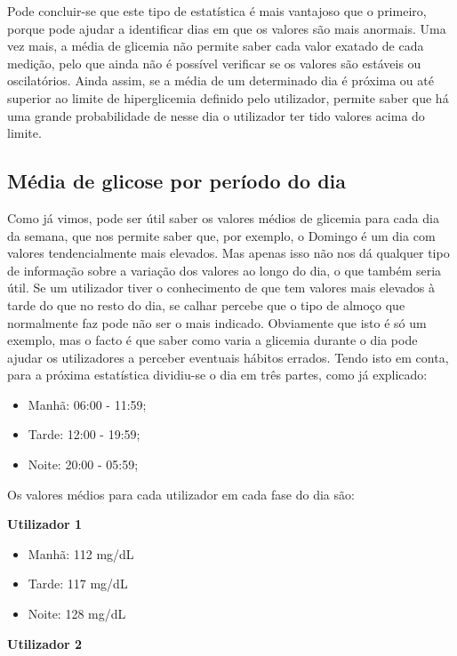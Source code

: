 Pode concluir-se que este tipo de estatística é mais vantajoso que o primeiro, porque pode ajudar a identificar dias em que os valores são mais anormais. Uma vez mais, a média de glicemia não permite saber cada valor exatado de cada medição, pelo que ainda não é possível verificar se os valores são estáveis ou oscilatórios. Ainda assim, se a média de um determinado dia é próxima ou até superior ao limite de hiperglicemia definido pelo utilizador, permite saber que há uma grande probabilidade de nesse dia o utilizador ter tido valores acima do limite.

\subsection{Média de glicose por período do dia}

Como já vimos, pode ser útil saber os valores médios de glicemia para cada dia da semana, que nos permite saber que, por exemplo, o Domingo é um dia com valores tendencialmente mais elevados. Mas apenas isso não nos dá qualquer tipo de informação sobre a variação dos valores ao longo do dia, o que também seria útil. Se um utilizador tiver o conhecimento de que tem valores mais elevados à tarde do que no resto do dia, se calhar percebe que o tipo de almoço que normalmente faz pode não ser o mais indicado. Obviamente que isto é só um exemplo, mas o facto é que saber como varia a glicemia durante o dia pode ajudar os utilizadores a perceber eventuais hábitos errados. 
Tendo isto em conta, para a próxima estatística dividiu-se o dia em três partes, como já explicado:

\begin{itemize}
\item Manhã: 06:00 - 11:59;
\item Tarde: 12:00 - 19:59;
\item Noite: 20:00 - 05:59;
\end{itemize}

Os valores médios para cada utilizador em cada fase do dia são:\newline

\textbf{Utilizador 1}

\begin{itemize}
\item Manhã: 112 mg/dL
\item Tarde: 117 mg/dL
\item Noite: 128 mg/dL
\end{itemize}

\textbf{Utilizador 2}

